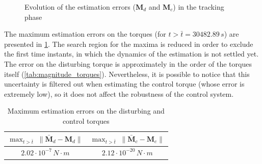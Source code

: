 \begin{figure}[h!]
    \caption{Evolution of the estimation errors ($\mathbf{M}_d$ and $\mathbf{M}_c$) in the tracking phase}
    \label{fig:tracking-estM}
\end{figure}

The maximum estimation errors on the torques (for $t > \bar{t} = 30482.89 \, s$) are presented in \cref{tab:torques_estimation}. The search region for the maxima is reduced in order to exclude the first time instants, in which the dynamics of the estimation is not settled yet. The error on the disturbing torque is approximately in the order of the torques itself (\cref{tab:magnitude_torques}). Nevertheless, it is possible to notice that this uncertainty is filtered out when estimating the control torque (whose error is extremely low), so it does not affect the robustness of the control system.

\begin{table}[h!]
    \centering
    \caption{Maximum estimation errors on the disturbing and control torques}
    \begin{tabular}{cc}
    \toprule
    \toprule
    $\max_{t > \bar{t}} \; \| \bar{\mathbf{M}}_d - \mathbf{M}_d \|$ & $\max_{t > \bar{t}} \; \| \bar{\mathbf{M}}_c - \mathbf{M}_c \|$ \\
    \midrule
    $2.02 \cdot 10^{-7} \, N \cdot m$ & $2.12 \cdot 10^{-20} \, N \cdot m$ \\
    \bottomrule
    \bottomrule
    \end{tabular}
    \label{tab:torques_estimation}
\end{table}

